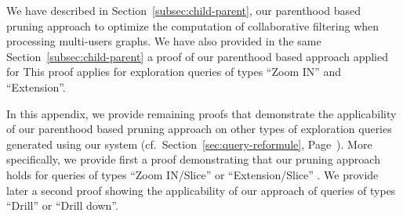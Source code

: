 
We have described in Section~\ref{subsec:child-parent}, our parenthood based pruning approach to optimize the computation of collaborative filtering when processing multi-users graphs.
We have also provided in the same Section~\ref{subsec:child-parent} a proof of our parenthood based approach applied for 
This proof applies for exploration queries of types ``Zoom IN''  and ``Extension''. 

In this appendix, we provide remaining proofs that demonstrate the applicability of our parenthood based pruning approach on other types of exploration queries generated using our system \prototype{} (cf.~Section~\ref{sec:query-reformule}, Page~\pageref{sec:query-reformule}).
More specifically, we provide first a proof demonstrating that our pruning approach holds for queries of types ``Zoom IN/Slice'' or ``Extension/Slice'' . We provide later a second proof showing the applicability of our approach of queries of types ``Drill'' or ``Drill down''.

